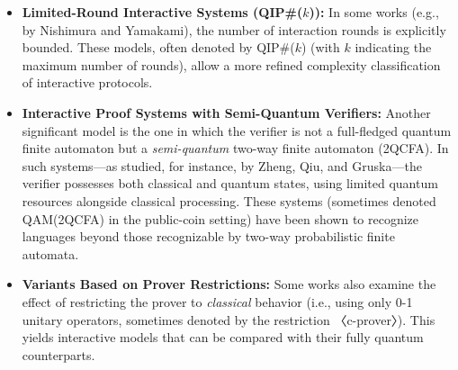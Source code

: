 \begin{itemize}
  \item \textbf{Limited-Round Interactive Systems (QIP\#($k$)):} In some works (e.g., by Nishimura and Yamakami), the number of interaction rounds is explicitly bounded. These models, often denoted by QIP\#($k$) (with $k$ indicating the maximum number of rounds), allow a more refined complexity classification of interactive protocols.
  
  \item \textbf{Interactive Proof Systems with Semi-Quantum Verifiers:} Another significant model is the one in which the verifier is not a full-fledged quantum finite automaton but a \emph{semi-quantum} two-way finite automaton (2QCFA). In such systems—as studied, for instance, by Zheng, Qiu, and Gruska—the verifier possesses both classical and quantum states, using limited quantum resources alongside classical processing. These systems (sometimes denoted QAM(2QCFA) in the public-coin setting) have been shown to recognize languages beyond those recognizable by two-way probabilistic finite automata.
  
  \item \textbf{Variants Based on Prover Restrictions:} Some works also examine the effect of restricting the prover to \emph{classical} behavior (i.e., using only 0-1 unitary operators, sometimes denoted by the restriction 〈c-prover〉). This yields interactive models that can be compared with their fully quantum counterparts.
\end{itemize}